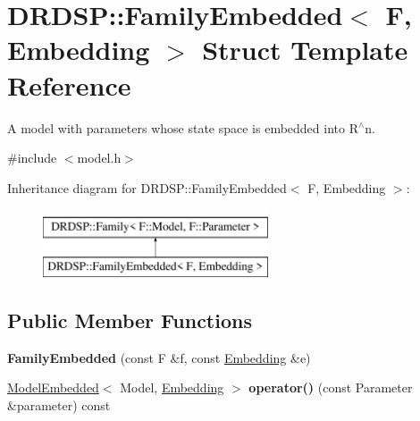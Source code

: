 \hypertarget{struct_d_r_d_s_p_1_1_family_embedded}{\section{D\-R\-D\-S\-P\-:\-:Family\-Embedded$<$ F, Embedding $>$ Struct Template Reference}
\label{struct_d_r_d_s_p_1_1_family_embedded}
}


A model with parameters whose state space is embedded into R$^\wedge$n.  




{\ttfamily \#include $<$model.\-h$>$}

Inheritance diagram for D\-R\-D\-S\-P\-:\-:Family\-Embedded$<$ F, Embedding $>$\-:\begin{figure}[H]
\begin{center}
\leavevmode
\includegraphics[height=2.000000cm]{struct_d_r_d_s_p_1_1_family_embedded}
\end{center}
\end{figure}
\subsection*{Public Member Functions}
\begin{DoxyCompactItemize}
\item 
\hypertarget{struct_d_r_d_s_p_1_1_family_embedded_af982885699e0b1737bc1e75b97c912c3}{{\bfseries Family\-Embedded} (const F \&f, const \hyperlink{struct_d_r_d_s_p_1_1_embedding}{Embedding} \&e)}\label{struct_d_r_d_s_p_1_1_family_embedded_af982885699e0b1737bc1e75b97c912c3}

\item 
\hypertarget{struct_d_r_d_s_p_1_1_family_embedded_a24c6c235505da6b4f27132d13f2c421a}{\hyperlink{struct_d_r_d_s_p_1_1_model_embedded}{Model\-Embedded}$<$ Model, \hyperlink{struct_d_r_d_s_p_1_1_embedding}{Embedding} $>$ {\bfseries operator()} (const Parameter \&parameter) const }\label{struct_d_r_d_s_p_1_1_family_embedded_a24c6c235505da6b4f27132d13f2c421a}

\end{DoxyCompactItemize}
